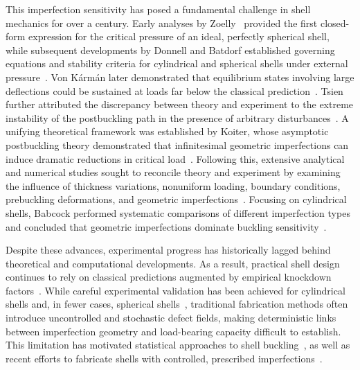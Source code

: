 \documentclass[twocolumn,letter,11pt]{article}
\begin{document}
This imperfection sensitivity has posed a fundamental challenge in shell mechanics for over a century. Early analyses by Zoelly~\cite{zoelly1915ueber} provided the first closed-form expression for the critical pressure of an ideal, perfectly spherical shell, while subsequent developments by Donnell and Batdorf established governing equations and stability criteria for cylindrical and spherical shells under external pressure~\cite{donnell1935stability,batdorf1947simplified}. 
Von K\'{a}rm\'{a}n later demonstrated that equilibrium states involving large deflections could be sustained at loads far below the classical prediction~\cite{von1939buckling,von1940influence,von1941buckling}.
Tsien further attributed the discrepancy between theory and experiment to the extreme instability of the postbuckling path in the presence of arbitrary disturbances~\cite{tsien1942theory}.
A unifying theoretical framework was established by Koiter, whose asymptotic postbuckling theory demonstrated that infinitesimal geometric imperfections can induce dramatic reductions in critical load~\cite{koiter1967stability}. 
Following this, extensive analytical and numerical studies sought to reconcile theory and experiment by examining the influence of thickness variations, nonuniform loading, boundary conditions, prebuckling deformations, and geometric imperfections~\cite{hutchinson1967imperfection,thompson1962elastic}. Focusing on cylindrical shells, Babcock performed systematic comparisons of different imperfection types and concluded that geometric imperfections dominate buckling sensitivity~\cite{babcock1983shell}.

Despite these advances, experimental progress has historically lagged behind theoretical and computational developments. 
As a result, practical shell design continues to rely on classical predictions augmented by empirical knockdown factors~\cite{von1939buckling}. 
While careful experimental validation has been achieved for cylindrical shells and, in fewer cases, spherical shells~\cite{hutchinson1967imperfection,koiter1967stability}, traditional fabrication methods often introduce uncontrolled and stochastic defect fields, making deterministic links between imperfection geometry and load-bearing capacity difficult to establish. 
This limitation has motivated statistical approaches to shell buckling~\cite{godoy1996thin}, as well as recent efforts to fabricate shells with controlled, prescribed imperfections~\cite{lee2016fabrication,marthelot2017buckling,abbasi2023comparing}.
\end{document}
